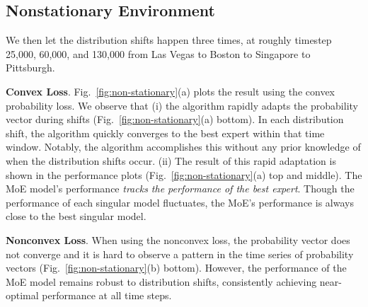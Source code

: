 \subsection{Nonstationary Environment}


We then let the distribution shifts happen three times, at roughly timestep 25,000, 60,000, and 130,000 from Las Vegas to Boston to Singapore to Pittsburgh.

{\bf Convex Loss}.
Fig.~\ref{fig:non-stationary}(a) plots the result using the convex probability loss. We observe that (i) the \squint algorithm rapidly adapts the probability vector during shifts (Fig.~\ref{fig:non-stationary}(a) bottom). In each distribution shift, the algorithm quickly converges to the best expert within that time window. Notably, the \squint algorithm accomplishes this without any prior knowledge of when the distribution shifts occur. (ii) The result of this rapid adaptation is shown in the performance plots (Fig.~\ref{fig:non-stationary}(a) top and middle). The MoE model's performance \emph{tracks the performance of the best expert}. Though the performance of each singular model fluctuates, the MoE's performance is always close to the best singular model.

{\bf Nonconvex Loss}.
When using the nonconvex loss, the probability vector does not converge and it is hard to observe a pattern in the time series of probability vectors (Fig.~\ref{fig:non-stationary}(b) bottom). However, the performance of the MoE model remains robust to distribution shifts, consistently achieving near-optimal performance at all time steps.

